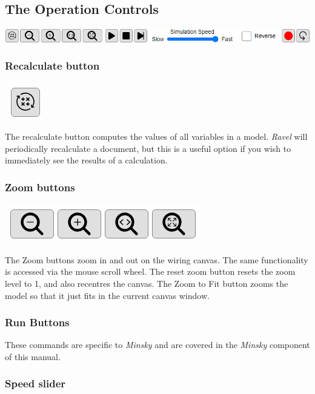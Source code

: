 \subsection{The Operation Controls}

\includegraphics[width=15cm]{images/OperationsControls}

\subsubsection{Recalculate button}

\includegraphics{images/Recalc}

The recalculate button computes the values of all variables in a model.
\emph{Ravel} will periodically recalculate a document, but this is
a useful option if you wish to immediately see the results of a calculation.

\subsubsection{Zoom buttons}

\label{ZoomButtons}

\includegraphics{images/ZoomControls}

The Zoom buttons zoom in and out on the wiring canvas. The same functionality
is accessed via the mouse scroll wheel. The reset zoom button 
resets the zoom level to 1, and also recentres the canvas. The Zoom
to Fit button zooms the model so that it just fits in the current
canvas window.

\subsubsection{Run Buttons}

These commands are specific to \emph{Minsky} and are covered in the
\emph{Minsky} component of this manual.

\subsubsection{Speed slider}

